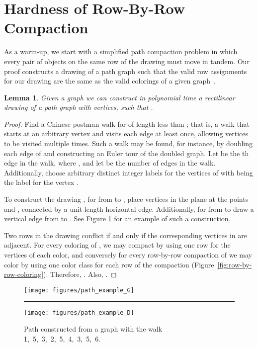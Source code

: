 \documentclass[12pt]{article}
\newtheorem{lemma}[theorem]{Lemma}
\theoremstyle{definitions}
\begin{document}
\section{Hardness of Row-By-Row Compaction}
\label{sec:row-by-row}

As a warm-up, we start with a simplified path compaction problem in which every pair of objects on the same row of the drawing must move in tandem. Our proof constructs a drawing of a path graph such that the valid row assignments for our drawing are the same as the valid colorings of a given graph~.

\begin{lemma}
\label{path lemma}
Given a graph  we can construct in polynomial time a rectilinear drawing  of a path graph with  vertices, such that .
\end{lemma}

\begin{proof}
Find a Chinese postman walk for  of length less than ; that is, a walk that starts at an arbitrary vertex and visits each edge at least once, allowing vertices to be visited multiple times. Such a walk may be found, for instance, by doubling each edge of  and constructing an Euler tour of the doubled graph. Let  be the th edge in the walk, where , and let  be the number of edges in the walk. Additionally, choose arbitrary distinct integer labels for the vertices of   with  being the label for the vertex .

To construct the drawing , for  from  to , place
vertices in the plane at the points  and , connected by a unit-length horizontal edge. Additionally, for  from  to  draw a vertical edge from  to . See Figure \ref{fig:path_example} for an example of such a construction.

Two rows in the drawing conflict if and only
if the corresponding vertices in  are adjacent. For every coloring of ,
we may compact  by using one row for the vertices of each color, and conversely for every row-by-row compaction of  we may color  by using one color class for each row of the compaction (Figure~\ref{fig:row-by-row-coloring}). Therefore, . Also, .
\end{proof}

\begin{figure}[t]
\centering
\texttt{[image: figures/path\_example\_G]}\rule{4em}{0em}
\texttt{[image: figures/path\_example\_D]}
\caption{Path constructed from a graph  with the walk 1,~5,~3,~2,~5,~4,~3,~5,~6.}
\label{fig:path_example}
\end{figure}
\end{document}
